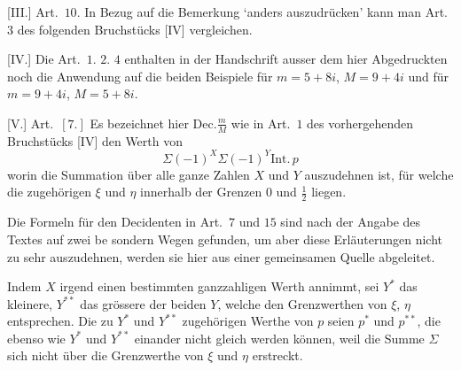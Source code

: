 [III.] Art.\ $10$. In Bezug auf die Bemerkung ‘anders auszudrücken’ kann man Art.\ $3$ des folgenden Bruchstücks [IV] vergleichen.

[IV.] Die Art.\ $1$. $2$. $4$ enthalten in der Handschrift ausser dem hier Abgedruckten noch die Anwendung auf die beiden Beispiele für $m=5+8i$, $M=9+4i$ und für $m=9+4i$, $M=5+8i$.

[V.] Art.\ $[7.]$ Es bezeichnet hier $\mathrm{Dec.}\frac mM$ wie in Art.\ $1$ des vorhergehenden Bruchstücks [IV] den Werth von
\[
\Sigma(-1)^X\Sigma(-1)^Y\mathrm{Int.}\,p
\]
worin die Summation über alle ganze Zahlen $X$ und $Y$ auszudehnen ist, für welche die zugehörigen $\xi$ und $\eta$ innerhalb der Grenzen $0$ und $\tfrac12$ liegen.

Die Formeln für den Decidenten in Art.\ $7$ und $15$ sind nach der Angabe des Textes auf zwei be%
%
sondern Wegen gefunden, um aber diese Erläuterungen nicht zu sehr auszudehnen, werden sie hier aus einer gemeinsamen Quelle abgeleitet.

Indem $X$ irgend einen bestimmten ganzzahligen Werth annimmt, sei $Y^{*}$ das kleinere, $Y^{**}$ das grössere der beiden $Y$, welche den Grenzwerthen von $\xi$, $\eta$ entsprechen. Die zu $Y^{*}$ und $Y^{**}$ zugehörigen Werthe von $p$ seien $p^{*}$ und $p^{**}$, die ebenso wie $Y^{*}$ und $Y^{**}$ einander nicht gleich werden können, weil die Summe $\Sigma$ sich nicht über die Grenzwerthe von $\xi$ und $\eta$ erstreckt.

